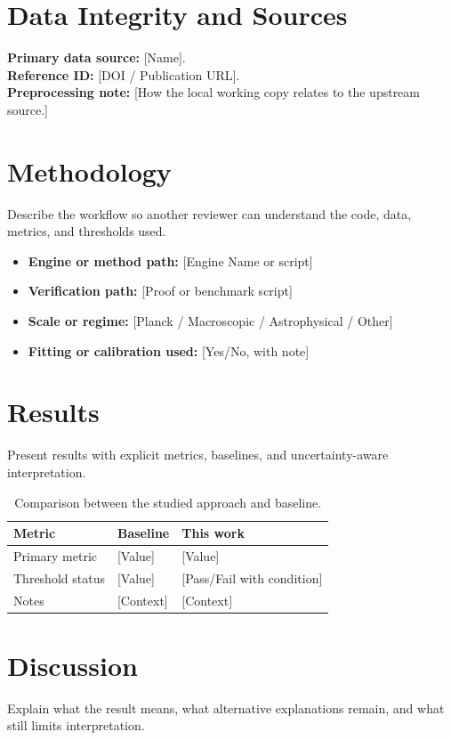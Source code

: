 \documentclass[11pt,a4paper,oneside]{article}
\begin{document}
\section{Data Integrity and Sources}
\textbf{Primary data source:} [Name]. \\
\textbf{Reference ID:} [DOI / Publication URL]. \\
\textbf{Preprocessing note:} [How the local working copy relates to the upstream source.]

\section{Methodology}
Describe the workflow so another reviewer can understand the code, data, metrics, and
thresholds used.
\begin{itemize}
    \item \textbf{Engine or method path:} [Engine Name or script]
    \item \textbf{Verification path:} [Proof or benchmark script]
    \item \textbf{Scale or regime:} [Planck / Macroscopic / Astrophysical / Other]
    \item \textbf{Fitting or calibration used:} [Yes/No, with note]
\end{itemize}

\section{Results}
Present results with explicit metrics, baselines, and uncertainty-aware interpretation.
\begin{table}[h!]
  \centering
  \caption{Comparison between the studied approach and baseline.}
  \begin{tabular}{@{}lll@{}}
    \toprule
    Metric & Baseline & This work \\ \midrule
    Primary metric & [Value] & [Value] \\
    Threshold status & [Value] & [Pass/Fail with condition] \\
    Notes & [Context] & [Context] \\ \bottomrule
  \end{tabular}
\end{table}

\section{Discussion}
Explain what the result means, what alternative explanations remain, and what still limits
interpretation.
\end{document}
